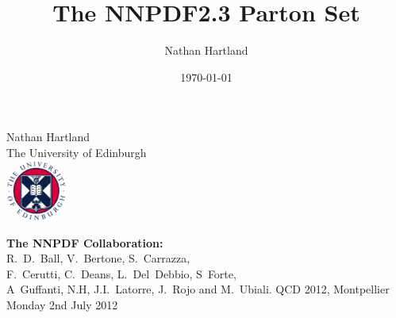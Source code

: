 \documentclass[10pt]{beamer}
\title[]{The NNPDF2.3 Parton Set}
\author{Nathan Hartland}
\institute
{
University of Edinburgh\\
\medskip
}
\date{\today}
\newcommand{\vso}{\vskip15pt}
\begin{document}
\renewcommand{\inserttotalframenumber}{14}


\begin{frame}
\begin{centering}
\vskip20pt
\vskip20pt
Nathan Hartland\\

\small{The University of Edinburgh}\\
\vso
\includegraphics[height=2cm]{edinburghcrest.pdf}

\vskip10pt
{\bf The NNPDF Collaboration:}\\
R.~D.~Ball, V.~Bertone, S.~Carrazza,\\ F.~Cerutti,
C.~Deans, L.~Del~Debbio, S~Forte,\\
A~Guffanti, N.H, J.I.~Latorre, J.~Rojo and M.~Ubiali. 
\vskip20pt
QCD 2012, Montpellier\\
Monday 2nd July 2012

\end{centering}

\end{frame}
\end{document}
